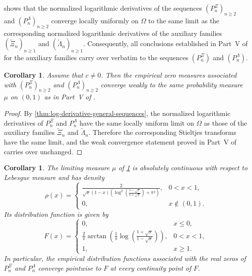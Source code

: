 \documentclass[11pt,twoside]{article}
\newtheorem{corollary}[theorem]{Corollary}
\numberwithin{equation}{section}
\begin{document}
\vspace{1cm}

 shows that the normalized
logarithmic derivatives of the sequences \((P_n^\Xi)_{n\ge2}\) and
\((P_n^\Lambda)_{n\ge2}\) converge locally uniformly on \(\Omega\) to the same
limit as the corresponding normalized logarithmic derivatives of the auxiliary
families \((\widetilde{\Xi}_n)_{n\ge1}\) and
\((\widetilde{\Lambda}_n)_{n\ge1}\). Consequently, all conclusions established
in Part~V of \cite{TallaWaffo2026arxiv2602.16761} for the auxiliary families
carry over verbatim to the sequences \((P_n^\Xi)\) and \((P_n^\Lambda)\).

\begin{corollary}\label{cor:transport-zero-distribution}
Assume that \(c\neq 0\). Then the empirical zero measures associated with
\((P_n^\Xi)_{n\ge2}\) and \((P_n^\Lambda)_{n\ge2}\) converge weakly to the same
probability measure \(\mu\) on \((0,1)\) as in Part~V of
\cite{TallaWaffo2026arxiv2602.16761}.
\end{corollary}

\begin{proof}
By \cref{thm:log-derivative-general-sequences}, the normalized
logarithmic derivatives of \(P_n^\Xi\) and \(P_n^\Lambda\) have the same
locally uniform limit on \(\Omega\) as those of the auxiliary families
\(\widetilde{\Xi}_n\) and \(\widetilde{\Lambda}_n\). Therefore the corresponding
Stieltjes transforms have the same limit, and the weak convergence statement
proved in Part~V of \cite{TallaWaffo2026arxiv2602.16761} carries over unchanged.
\end{proof}

\begin{corollary}\label{cor:transport-density-cdf}
The limiting measure \(\mu\) of \cref{cor:transport-zero-distribution} is
absolutely continuous with respect to Lebesgue measure and has density
\[
\rho(x)=
\begin{cases}
\displaystyle
\frac{2}{\sqrt{x}(1-x)\left(\log^2\!\left(\frac{1-\sqrt{x}}{1+\sqrt{x}}\right)+\pi^2\right)},
& 0<x<1,\\[1em]
0, & x\notin(0,1).
\end{cases}
\]
Its distribution function is given by
\[
F(x)=
\begin{cases}
0, & x\le 0,\\[0.4em]
\displaystyle
\frac{2}{\pi}\arctan\!\left(
\frac{1}{\pi}\log\!\left(\frac{1+\sqrt{x}}{1-\sqrt{x}}\right)
\right),
& 0<x<1,\\[0.8em]
1, & x\ge 1.
\end{cases}
\]
In particular, the empirical distribution functions associated with the real
zeros of \(P_n^\Xi\) and \(P_n^\Lambda\) converge pointwise to \(F\) at every
continuity point of \(F\).
\end{corollary}
\end{document}
